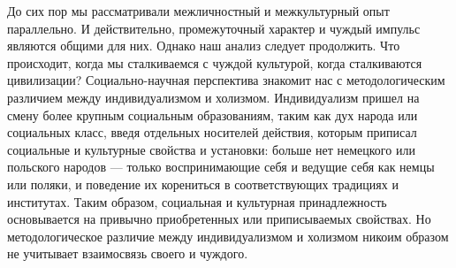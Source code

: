 \documentclass[12pt]{book}
\begin{document}
До сих пор мы рассматривали межличностный и межкультурный опыт параллельно. И действительно, промежуточный характер и чуждый импульс являются общими для них. Однако наш анализ следует продолжить. Что происходит, когда мы сталкиваемся с чуждой культурой, когда сталкиваются цивилизации? Социально-научная перспектива знакомит нас с методологическим различием между индивидуализмом и холизмом. Индивидуализм пришел на смену более крупным социальным образованиям, таким как дух народа или социальных класс, введя отдельных носителей действия, которым приписал социальные и культурные свойства и установки: больше нет немецкого или польского народов --- только воспринимающие себя и ведущие себя как немцы или поляки, и поведение их корениться в соответствующих традициях и институтах. Таким образом, социальная и культурная принадлежность основывается на привычно приобретенных или приписываемых свойствах. Но методологическое различие между индивидуализмом и холизмом никоим образом не учитывает взаимосвязь своего и чуждого.
\end{document}
